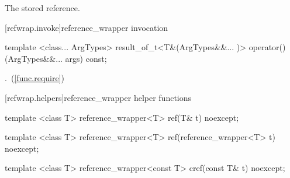 \begin{itemdescr}
\pnum\returns The stored reference.
\end{itemdescr}


[refwrap.invoke]{reference_wrapper invocation}

%
%
\begin{itemdecl}
template <class... ArgTypes>
  result_of_t<T&(ArgTypes&&... )>
    operator()(ArgTypes&&... args) const;
\end{itemdecl}

\begin{itemdescr}
\pnum\returns {}.~(\ref{func.require})
\end{itemdescr}


[refwrap.helpers]{reference_wrapper helper functions}

%
%
\begin{itemdecl}
template <class T> reference_wrapper<T> ref(T& t) noexcept;
\end{itemdecl}

\begin{itemdescr}
\pnum\returns {}
\end{itemdescr}

%
%
\begin{itemdecl}
template <class T> reference_wrapper<T> ref(reference_wrapper<T> t) noexcept;
\end{itemdecl}

\begin{itemdescr}
\pnum\returns {}
\end{itemdescr}

%
%
\begin{itemdecl}
template <class T> reference_wrapper<const T> cref(const T& t) noexcept;
\end{itemdecl}

\begin{itemdescr}
\pnum\returns {}
\end{itemdescr}

